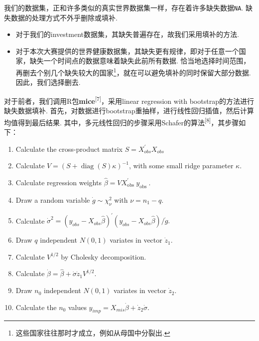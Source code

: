 \documentclass[]{ctexart}
\providecommand{\tightlist}{%
  \setlength{\itemsep}{0pt}\setlength{\parskip}{0pt}}
\begin{document}
我们的数据集，正和许多类似的真实世界数据集一样，存在着许多缺失数据\texttt{NA}.
缺失数据的处理方式不外乎删除或填补.

\begin{itemize}
\tightlist
\item
  对于我们的investment数据集，其缺失普遍存在，故我们采用填补的方法.
\item
  对于本次大赛提供的世界健康数据集，其缺失更有规律，即对于任意一个国家，缺失一个时间点的数据意味着缺失此前所有数据.
  恰当地选择时间范围，再删去个别几个缺失较大的国家\footnote{这些国家往往那时才成立，例如从母国中分裂出.}，就在可以避免填补的同时保留大部分数据.
  因此，我们选择删去.
\end{itemize}

对于前者，我们调用R包\textbf{mice}\textsuperscript{{[}7{]}}，采用linear
regression with bootstrap的方法进行缺失数据填补.
首先，对数据进行bootstrap重抽样，进行线性回归插值，然后计算均值得到最后结果.
其中，多元线性回归的步骤采用Schafer的算法\textsuperscript{{[}8{]}}，其步骤如下：

\begin{enumerate}
\def\labelenumi{\arabic{enumi}.}
\item
  Calculate the cross-product matrix \(S=X_{o b s}^{\prime} X_{o b s}\)
\item
  Calculate \(V=(S+\operatorname{diag}(S) \kappa)^{-1}\), with some
  small ridge parameter \(\kappa\).
\item
  Calculate regression weights
  \(\hat{\beta}=V X_{\text {obs }}^{\prime} y_{\text {obs }}\).
\item
  Draw a random variable \(\dot{g} \sim \chi_{\nu}^{2}\) with
  \(\nu=n_{1}-q\).
\item
  Calculate
  \(\dot{\sigma}^{2}=\left(y_{o b s}-X_{o b s} \hat{\beta}\right)^{\prime}\left(y_{o b s}-X_{o b s} \hat{\beta}\right) / \dot{g} .\)
\item
  Draw \(q\) independent \(N(0,1)\) variates in vector \(\dot{z}_{1}\).
\item
  Calculate \(V^{1 / 2}\) by Cholesky decomposition.
\item
  Calculate
  \(\dot{\beta}=\hat{\beta}+\dot{\sigma} \dot{z}_{1} V^{1 / 2}\).
\item
  Draw \(n_{0}\) independent \(N(0,1)\) variates in vector
  \(\dot{z}_{2}\).
\item
  Calculate the \(n_{0}\) values
  \(y_{i m p}=X_{m i s} \dot{\beta}+\dot{z}_{2} \dot{\sigma}\).
\end{enumerate}
\end{document}
